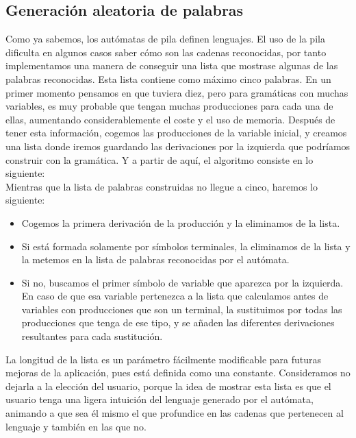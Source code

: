 \documentclass[12pt,a4paper,spanish]{book}
\begin{document}
\subsection{Generaci\'on aleatoria de palabras}
Como ya sabemos, los aut\'omatas de pila definen lenguajes. El uso de la pila dificulta en algunos casos saber c\'omo son las cadenas reconocidas, por tanto implementamos una manera de conseguir una lista que mostrase algunas de las palabras reconocidas.
Esta lista contiene como m\'aximo cinco palabras. En un primer momento pensamos en que tuviera diez, pero para gram\'aticas con muchas variables, es muy probable que tengan muchas producciones para cada una de ellas, aumentando considerablemente el coste y el uso de memoria.
Despu\'es de tener esta informaci\'on, cogemos las producciones de la variable inicial, y creamos una lista donde iremos guardando las derivaciones por la izquierda que podr\'iamos construir con la gram\'atica. Y a partir de aqu\'i, el algoritmo consiste en lo siguiente:\\
\newline
Mientras que la lista de palabras construidas no llegue a cinco, haremos lo siguiente:
\begin{itemize}
\item Cogemos la primera derivaci\'on de la producci\'on y la eliminamos de la lista.
\item Si est\'a formada solamente por s\'imbolos terminales, la eliminamos de la lista y la metemos en la lista de palabras reconocidas por el aut\'omata. 
\item Si no, buscamos el primer s\'imbolo de variable que aparezca por la izquierda. En caso de que esa variable pertenezca a la lista que calculamos antes de variables con producciones que son un terminal, la sustituimos por todas las producciones que tenga de ese tipo, y se a\~naden las diferentes derivaciones resultantes para cada sustituci\'on.
\end{itemize}
La longitud de la lista es un par\'ametro f\'acilmente modificable para futuras mejoras de la aplicaci\'on, pues est\'a definida como una constante. Consideramos no dejarla a la elecci\'on del usuario, porque la idea de mostrar esta lista es que el usuario tenga una ligera intuici\'on del lenguaje generado por el aut\'omata, animando a que sea \'el mismo el que profundice en las cadenas que pertenecen al lenguaje y tambi\'en en las que no.
\newpage
\end{document}
